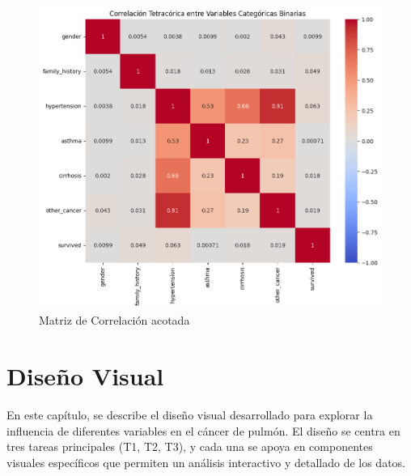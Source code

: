 \documentclass[10pt,journal,compsoc]{IEEEtran}
\begin{document}
\begin{figure}[htb]
    \centering
    \includegraphics[width=\linewidth]{imagenes/corr_tetra.png}
    \caption{Matriz de Correlación acotada}
    \label{fig:corr_tetra}
\end{figure}


\section{Diseño Visual}
En este capítulo, se describe el diseño visual desarrollado para explorar la influencia de diferentes variables en el cáncer de pulmón. El diseño se centra en tres tareas principales (T1, T2, T3), y cada una se apoya en componentes visuales específicos que permiten un análisis interactivo y detallado de los datos.
\end{document}

